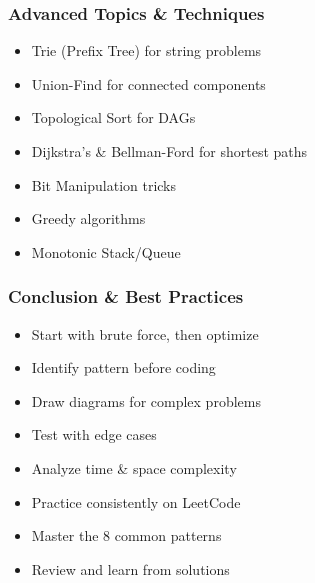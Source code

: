 \begin{frame}[fragile]\frametitle{Advanced Topics \& Techniques}

      \begin{itemize}
        \item Trie (Prefix Tree) for string problems
        \item Union-Find for connected components
        \item Topological Sort for DAGs
        \item Dijkstra's \& Bellman-Ford for shortest paths
        \item Bit Manipulation tricks
        \item Greedy algorithms
        \item Monotonic Stack/Queue
      \end{itemize}

\end{frame}

\begin{frame}[fragile]\frametitle{Conclusion \& Best Practices}

      \begin{itemize}
        \item Start with brute force, then optimize
        \item Identify pattern before coding
        \item Draw diagrams for complex problems
        \item Test with edge cases
        \item Analyze time \& space complexity
        \item Practice consistently on LeetCode
        \item Master the 8 common patterns
        \item Review and learn from solutions
      \end{itemize}

\end{frame}

